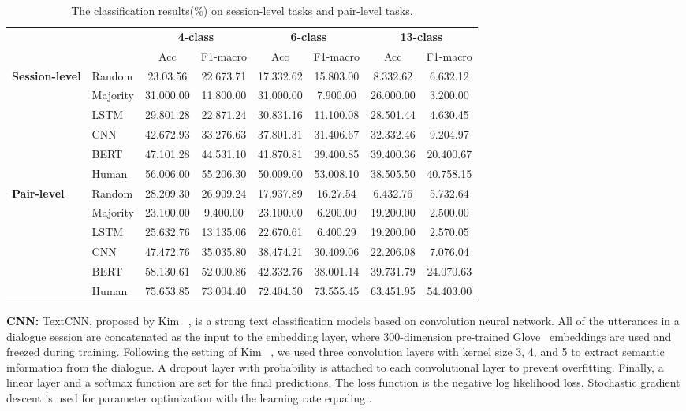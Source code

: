 \documentclass[letterpaper]{article} \usepackage{aaai21}  \usepackage{times}  \usepackage{helvet} \usepackage{courier}  \usepackage[hyphens]{url}  \usepackage{graphicx} \usepackage{xcolor}
\begin{document}
\begin{table*}[th]
	\centering
	\small
	\begin{tabular}{@{}llcccccc@{}}
		\toprule[1.5pt]
		&               				& \multicolumn{2}{c}{\textbf{4-class}} & \multicolumn{2}{c}{\textbf{6-class}} & \multicolumn{2}{c}{\textbf{13-class}} \\ 
		& & Acc & F1-macro                 & Acc & F1-macro                  & Acc & F1-macro \\
		\midrule
		\multirow{6}{*}{\textbf{Session-level}}&Random   &23.03.56 &22.673.71 &17.332.62 & 15.803.00& 8.332.62& 6.632.12  \\		
		&Majority    &31.000.00 &11.800.00 &31.000.00 &7.900.00 &26.000.00 &3.200.00 \\
		&LSTM    &29.801.28 &22.871.24 &30.831.16 &11.100.08 &28.501.44 &4.630.45 \\
		&CNN    &42.672.93 & 33.276.63&37.801.31 & 31.406.67 &32.332.46 &9.204.97 \\
&BERT   &47.101.28 &44.531.10 &41.870.81 &39.400.85 &39.400.36 &20.400.67 \\
		&Human &56.006.00 &55.206.30&50.009.00&53.008.10&38.505.50&40.758.15 \\ 
		\midrule
		\multirow{6}{*}{\textbf{Pair-level}}&Random   &28.209.30 &26.909.24 &17.937.89 &16.27.54 &6.432.76 & 5.732.64 \\		
		&Majority    &23.100.00 &9.400.00 &23.100.00 &6.200.00 &19.200.00 & 2.500.00\\
		&LSTM    &25.632.76 &13.135.06 &22.670.61 &6.400.29 &19.200.00 &2.570.05 \\	
		&CNN    &47.472.76 &35.035.80 &38.474.21 &30.409.06 & 22.206.08& 7.076.04\\	
&BERT   &58.130.61 &52.000.86 & 42.332.76&38.001.14 &39.731.79 &24.070.63 \\
		&Human & 75.653.85 &73.004.40 & 72.404.50&73.555.45 &63.451.95 &54.403.00 \\ 
		\bottomrule[1.5pt]
		
	\end{tabular}
	\caption{The classification results(\%) on session-level tasks and pair-level tasks.}
	\label{tab:results}
\end{table*}


\textbf{CNN:}
TextCNN, proposed by Kim ~, is a strong text classification models 
based on convolution neural network.
All of the utterances in a dialogue session are concatenated as the input to the 
embedding layer, where 300-dimension pre-trained Glove~ 
embeddings are used and freezed 
during training. Following the setting of Kim ~, we used three convolution layers
with kernel size 3, 4, and 5 to extract semantic information from the dialogue. A dropout layer with 
probability  is attached to each convolutional layer to prevent overfitting.
Finally, a linear layer and a softmax function are set for the final predictions. 
The loss function is the negative log likelihood loss. Stochastic gradient descent is 
used for parameter optimization with the learning rate equaling . 
\end{document}
